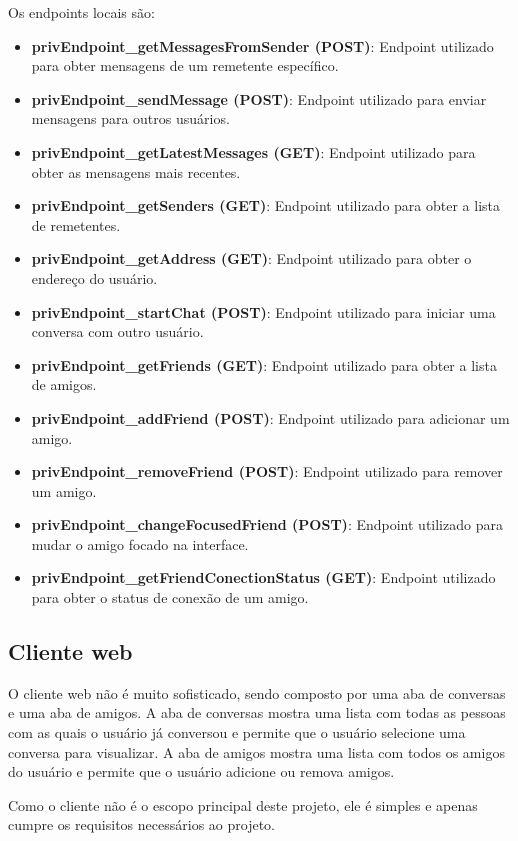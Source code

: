 Os endpoints locais são:

\begin{itemize}
\item \textbf{privEndpoint\_getMessagesFromSender (POST)}: Endpoint utilizado para obter mensagens de um remetente específico.
\item \textbf{privEndpoint\_sendMessage (POST)}: Endpoint utilizado para enviar mensagens para outros usuários.
\item \textbf{privEndpoint\_getLatestMessages (GET)}: Endpoint utilizado para obter as mensagens mais recentes.
\item \textbf{privEndpoint\_getSenders (GET)}: Endpoint utilizado para obter a lista de remetentes.
\item \textbf{privEndpoint\_getAddress (GET)}: Endpoint utilizado para obter o endereço do usuário.
\item \textbf{privEndpoint\_startChat (POST)}: Endpoint utilizado para iniciar uma conversa com outro usuário.
\item \textbf{privEndpoint\_getFriends (GET)}: Endpoint utilizado para obter a lista de amigos.
\item \textbf{privEndpoint\_addFriend (POST)}: Endpoint utilizado para adicionar um amigo.
\item \textbf{privEndpoint\_removeFriend (POST)}: Endpoint utilizado para remover um amigo.
\item \textbf{privEndpoint\_changeFocusedFriend (POST)}: Endpoint utilizado para mudar o amigo focado na interface.
\item \textbf{privEndpoint\_getFriendConectionStatus (GET)}: Endpoint utilizado para obter o status de conexão de um amigo.
\end{itemize}
\subsection{Cliente web}

O cliente web não é muito sofisticado, sendo composto por uma aba de conversas e uma aba de amigos. A aba de conversas mostra uma lista com todas as pessoas com as quais o usuário já conversou e permite que o usuário selecione uma conversa para visualizar. A aba de amigos mostra uma lista com todos os amigos do usuário e permite que o usuário adicione ou remova amigos.

Como o cliente não é o escopo principal deste projeto, ele é simples e apenas cumpre os requisitos necessários ao projeto.

